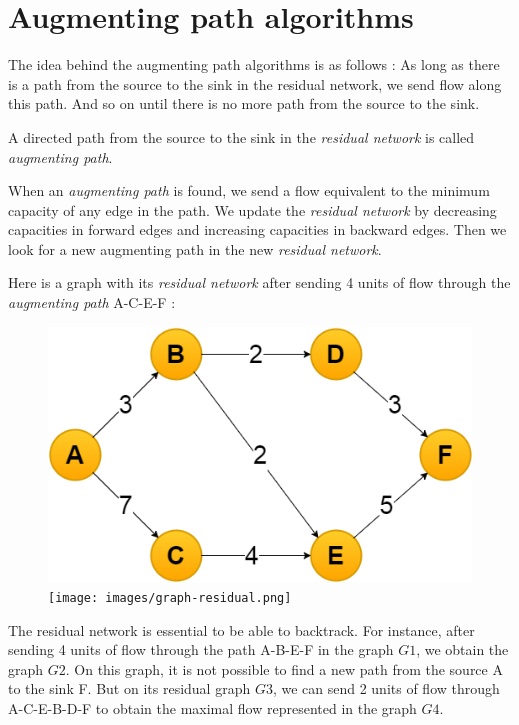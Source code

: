 \section{Augmenting path algorithms}
The idea behind the augmenting path algorithms is as follows : 
As long as there is a path from the source to the sink in the residual network, we send flow along this path. And so on until there is no more path from the source to the sink.\newline

A directed path from the source to the sink in the \textit{residual network} is called \textit{augmenting path}. \newline

When an \textit{augmenting path} is found, we send a flow equivalent to the minimum capacity of any edge in the path. We update the \textit{residual network} by decreasing capacities in forward edges and increasing capacities in backward edges. Then we look for a new augmenting path in the new \textit{residual network}. \newline

Here is a graph with its \textit{residual network} after sending 4 units of flow through the \textit{augmenting path} A-C-E-F : \newline

\begin{figure}[!h]
\includegraphics[scale=0.4]{images/graph.png}\hfill
\texttt{[image: images/graph-residual.png]}
\end{figure}
\newpage
The residual network is essential to be able to backtrack. For instance, after sending 4 units of flow through the path A-B-E-F in the graph $G1$, we obtain the graph $G2$. On this graph, it is not possible to find a new path from the source A to the sink F. But on its residual graph $G3$, we can send 2 units of flow through A-C-E-B-D-F to obtain the maximal flow represented in the graph $G4$.\\


